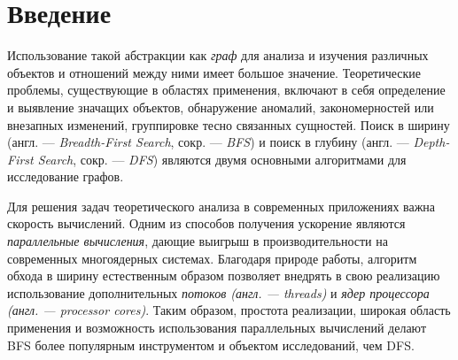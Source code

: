 
\section*{Введение}
\label{sec:intro}
Использование такой абстракции как \textit{граф} для анализа и изучения различных объектов и отношений между ними имеет большое значение. Теоретические проблемы, существующие в областях применения, включают в себя определение и выявление значащих объектов, обнаружение аномалий, закономерностей или внезапных изменений, группировке тесно связанных сущностей. Поиск в ширину (англ. --- \textit{Breadth-First Search}, сокр. --- \textit{BFS}) и поиск в глубину (англ. --- \textit{Depth-First Search}, сокр. --- \textit{DFS}) являются двумя основными алгоритмами для исследование графов. 

Для решения задач теоретического анализа в современных приложениях важна скорость вычислений. Одним из способов получения ускорение являются \textit{параллельные вычисления}, дающие выигрыш в производительности на современных многоядерных системах. Благодаря природе работы, алгоритм обхода в ширину естественным образом позволяет внедрять в свою реализацию использование дополнительных \textit{потоков (англ. --- threads)} и \textit{ядер процессора (англ. --- processor cores)}. Таким образом, простота реализации, широкая область применения и возможность использования параллельных вычислений делают BFS более популярным инструментом и объектом исследований, чем DFS.
